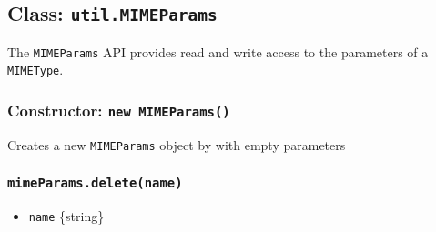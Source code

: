 \subsection{\texorpdfstring{Class:
\texttt{util.MIMEParams}}{Class: util.MIMEParams}}\label{class-util.mimeparams}

The \texttt{MIMEParams} API provides read and write access to the
parameters of a \texttt{MIMEType}.

\subsubsection{\texorpdfstring{Constructor:
\texttt{new\ MIMEParams()}}{Constructor: new MIMEParams()}}\label{constructor-new-mimeparams}

Creates a new \texttt{MIMEParams} object by with empty parameters

\begin{Shaded}
\begin{Highlighting}[]
 \OperatorTok{;}

\OperatorTok{=}  \NormalTok{()}\OperatorTok{;}
\end{Highlighting}
\end{Shaded}

\begin{Shaded}
\begin{Highlighting}[]
\OperatorTok{=} \NormalTok{(}\NormalTok{)}\OperatorTok{;}

\OperatorTok{=}  \NormalTok{()}\OperatorTok{;}
\end{Highlighting}
\end{Shaded}

\subsubsection{\texorpdfstring{\texttt{mimeParams.delete(name)}}{mimeParams.delete(name)}}\label{mimeparams.deletename}

\begin{itemize}
\tightlist
\item
  \texttt{name} \{string\}
\end{itemize}

